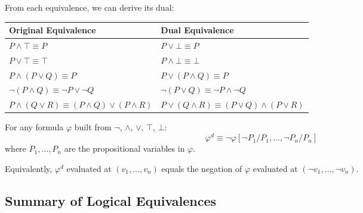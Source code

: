 \begin{example}
From each equivalence, we can derive its dual:

\begin{center}
\renewcommand{\arraystretch}{1.3}
\begin{tabular}{|l|l|}
\hline
\textbf{Original Equivalence} & \textbf{Dual Equivalence} \\
\hline
$P \wedge \top \equiv P$ & $P \vee \bot \equiv P$ \\
$P \vee \top \equiv \top$ & $P \wedge \bot \equiv \bot$ \\
$P \wedge (P \vee Q) \equiv P$ & $P \vee (P \wedge Q) \equiv P$ \\
$\neg(P \wedge Q) \equiv \neg P \vee \neg Q$ & $\neg(P \vee Q) \equiv \neg P \wedge \neg Q$ \\
$P \wedge (Q \vee R) \equiv (P \wedge Q) \vee (P \wedge R)$ & $P \vee (Q \wedge R) \equiv (P \vee Q) \wedge (P \vee R)$ \\
\hline
\end{tabular}
\end{center}
\end{example}

\begin{theorem}
For any formula $\varphi$ built from $\neg$, $\wedge$, $\vee$, $\top$, $\bot$:
\[
\varphi^d \equiv \neg\varphi[\neg P_1/P_1, \dots, \neg P_n/P_n]
\]
where $P_1, \dots, P_n$ are the propositional variables in $\varphi$.

Equivalently, $\varphi^d$ evaluated at $(v_1, \dots, v_n)$ equals the negation
of $\varphi$ evaluated at $(\neg v_1, \dots, \neg v_n)$.
\end{theorem}

\subsection{Summary of Logical Equivalences}

